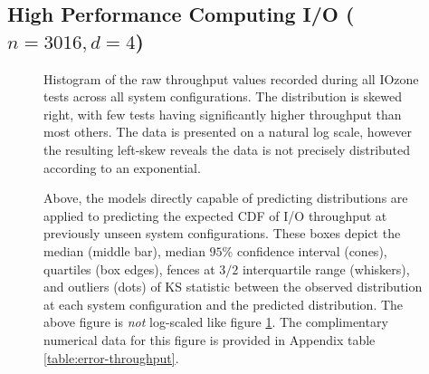 \documentclass[smallextended,final]{svjour3}       %
\begin{document}
\subsection{High Performance Computing I/O ($n = 3016, d = 4$)}

\begin{figure}
  \centering
  \caption{Histogram of the raw throughput values recorded during all
    IOzone tests across all system configurations. The distribution is
    skewed right, with few tests having significantly higher
    throughput than most others. The data is presented on a natural
    log scale, however the resulting left-skew reveals the data is not
    precisely distributed according to an exponential.}
  \label{fig:hist-throughput}
\end{figure}

\begin{figure}
  \centering
  \caption{Above, the models directly capable of predicting
    distributions are applied to predicting the expected CDF of I/O
    throughput at previously unseen system configurations. These
    boxes depict the median (middle bar), median $95\%$ confidence
    interval (cones), quartiles (box edges), fences at $3/2$
    interquartile range (whiskers), and outliers (dots) of KS
    statistic between the observed distribution at each system
    configuration and the predicted distribution. The above figure is
    \textit{not} log-scaled like figure \ref{fig:hist-throughput}. The
    complimentary numerical data for this figure is provided in
    Appendix table \ref{table:error-throughput}.}
  \label{fig:error-throughput}
\end{figure}
\end{document}
